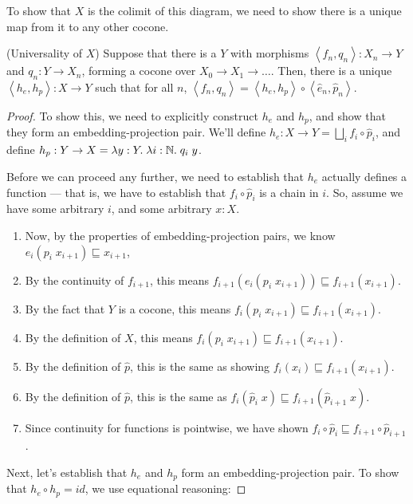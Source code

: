 To show that $X$ is the colimit of this diagram, we need to show there
is a unique map from it to any other cocone. 

\begin{lemma}{(Universality of $X$)} 
Suppose that there is a $Y$ with morphisms $\left<f_n, q_n\right> : X_n
\to Y$ and $q_n : Y \to X_n$, forming a cocone over $X_0 \longrightarrow
X_1 \longrightarrow \ldots$. Then, there is a unique 
$\left<h_e,h_p\right> : X \to Y$ such that for all $n$, 
$\left<f_n,q_n\right> = \left<h_e,h_p\right> \circ \left<\hat{e}_n, \hat{p}_n\right>$.
\end{lemma}

\begin{proof}
To show this, we need to explicitly construct $h_e$ and $h_p$, and show
that they form an embedding-projection pair. We'll define $h_e : X \to Y = 
\bigsqcup_i f_i \circ \hat{p}_i$, and define 
$h_p : Y \to X = \lambda y:Y.\; \lambda i:\mathbb{N}.\; q_i\; y$.

Before we can proceed any further, we need to establish that $h_e$
actually defines a function --- that is, we have to establish that
$f_i \circ \hat{p}_i$ is a chain in $i$. So, assume we have some
arbitrary $i$, and some arbitrary $x : X$.

\begin{enumerate}
\item Now, by the properties of embedding-projection pairs, we know
$e_i(p_i\;x_{i+1}) \sqsubseteq x_{i+1}$, 
\item By the continuity of $f_{i+1}$, 
this means $f_{i+1}(e_i(p_i\;x_{i+1})) \sqsubseteq f_{i+1}(x_{i+1})$. 
\item By the fact that $Y$ is a cocone, this
means $f_i(p_i\;x_{i+1})
\sqsubseteq f_{i+1}(x_{i+1})$. 
\item By the
definition of $X$, this means $f_i(p_i\;x_{i+1}) 
\sqsubseteq f_{i+1}(x_{i+1})$. 
\item By the definition of $\hat{p}$, this is 
the same as showing $f_i(x_i) \sqsubseteq f_{i+1}(x_{i+1})$. 
\item By the definition of $\hat{p}$, this is the same as 
   $f_i(\hat{p}_i\;x) \sqsubseteq f_{i+1}(\hat{p}_{i+1}\;x)$. 
\item Since continuity for functions is pointwise, we have 
shown $f_i \circ \hat{p}_i \sqsubseteq f_{i+1} \circ \hat{p}_{i+1}$. 
\end{enumerate}

Next, let's establish that $h_e$ and $h_p$ form an embedding-projection
pair. To show that $h_e \circ h_p = id$, we use equational reasoning:


\end{proof}
